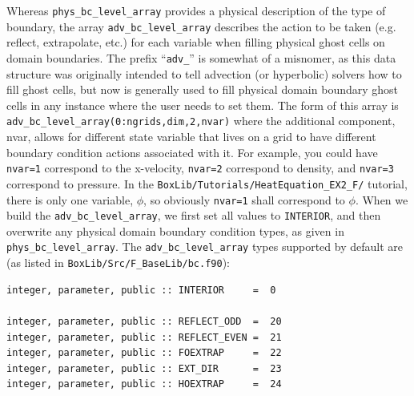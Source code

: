 Whereas {\tt phys\_bc\_level\_array} provides a physical description of the type of boundary, the array
{\tt adv\_bc\_level\_array} describes the action to be taken (e.g. reflect, extrapolate, etc.) for each 
variable when filling physical ghost cells on domain boundaries.  The prefix ``{\tt adv\_}'' is somewhat
of a misnomer, as this data structure was originally intended to tell advection (or hyperbolic) solvers
how to fill ghost cells, but now is generally used to fill physical domain boundary ghost cells in any
instance where the user needs to set them.
The form of this array is {\tt adv\_bc\_level\_array(0:ngrids,dim,2,nvar)}
where the additional component, nvar, allows for different state variable that lives on a grid to have 
different boundary condition actions associated with it.  For example, you could have {\tt nvar=1}
correspond to the x-velocity, {\tt nvar=2} correspond to density, and {\tt nvar=3} correspond to pressure.
In the {\tt BoxLib/Tutorials/HeatEquation\_EX2\_F/} tutorial, there is only one variable, $\phi$, so
obviously {\tt nvar=1} shall correspond to $\phi$.  When we build the {\tt adv\_bc\_level\_array},
we first set all values to {\tt INTERIOR}, and then overwrite any physical domain boundary condition types,
as given in {\tt phys\_bc\_level\_array}.  The {\tt adv\_bc\_level\_array} types supported by default are
(as listed in {\tt BoxLib/Src/F\_BaseLib/bc.f90}):
\begin{lstlisting}[backgroundcolor=\color{light-green}]
integer, parameter, public :: INTERIOR     =  0

integer, parameter, public :: REFLECT_ODD  =  20
integer, parameter, public :: REFLECT_EVEN =  21
integer, parameter, public :: FOEXTRAP     =  22
integer, parameter, public :: EXT_DIR      =  23
integer, parameter, public :: HOEXTRAP     =  24
\end{lstlisting}

